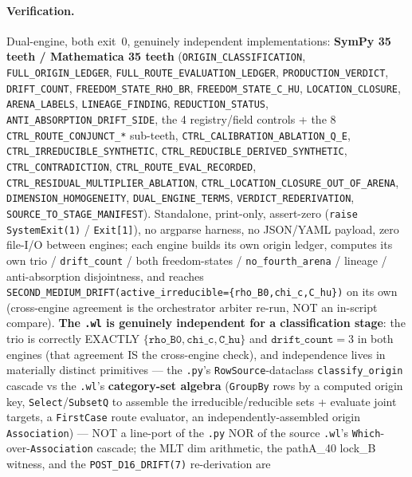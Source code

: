 \paragraph{Verification.}
Dual-engine, both exit~0, genuinely independent implementations:
\textbf{SymPy 35 teeth / Mathematica 35 teeth}
(\texttt{ORIGIN\_CLASSIFICATION}, \texttt{FULL\_ORIGIN\_LEDGER},
\texttt{FULL\_ROUTE\_EVALUATION\_LEDGER}, \texttt{PRODUCTION\_VERDICT},
\texttt{DRIFT\_COUNT}, \texttt{FREEDOM\_STATE\_RHO\_BR},
\texttt{FREEDOM\_STATE\_C\_HU}, \texttt{LOCATION\_CLOSURE}, \texttt{ARENA\_LABELS},
\texttt{LINEAGE\_FINDING}, \texttt{REDUCTION\_STATUS},
\texttt{ANTI\_ABSORPTION\_DRIFT\_SIDE}, the 4 registry/field controls + the 8
\texttt{CTRL\_ROUTE\_CONJUNCT\_*} sub-teeth, \texttt{CTRL\_CALIBRATION\_ABLATION\_Q\_E},
\texttt{CTRL\_IRREDUCIBLE\_SYNTHETIC}, \texttt{CTRL\_REDUCIBLE\_DERIVED\_SYNTHETIC},
\texttt{CTRL\_CONTRADICTION}, \texttt{CTRL\_ROUTE\_EVAL\_RECORDED},
\texttt{CTRL\_RESIDUAL\_MULTIPLIER\_ABLATION},
\texttt{CTRL\_LOCATION\_CLOSURE\_OUT\_OF\_ARENA}, \texttt{DIMENSION\_HOMOGENEITY},
\texttt{DUAL\_ENGINE\_TERMS}, \texttt{VERDICT\_REDERIVATION},
\texttt{SOURCE\_TO\_STAGE\_MANIFEST}). Standalone, print-only, assert-zero
(\texttt{raise SystemExit(1)} / \texttt{Exit[1]}), no argparse harness, no
JSON/YAML payload, zero file-I/O between engines; each engine builds its own
origin ledger, computes its own trio / \texttt{drift\_count} / both
freedom-states / \texttt{no\_fourth\_arena} / lineage / anti-absorption
disjointness, and reaches
\texttt{SECOND\_MEDIUM\_DRIFT(active\_irreducible=\{rho\_B0,chi\_c,C\_hu\})} on its
own (cross-engine agreement is the orchestrator arbiter re-run, NOT an in-script
compare). \textbf{The \texttt{.wl} is genuinely independent for a classification
stage}: the trio is correctly EXACTLY \(\{\texttt{rho\_B0},\texttt{chi\_c},\texttt{C\_hu}\}\)
and \(\texttt{drift\_count}=3\) in both engines (that agreement IS the
cross-engine check), and independence lives in materially distinct primitives ---
the \texttt{.py}'s \texttt{RowSource}-dataclass \texttt{classify\_origin} cascade
vs the \texttt{.wl}'s \textbf{category-set algebra} (\texttt{GroupBy} rows by a
computed origin key, \texttt{Select}/\texttt{SubsetQ} to assemble the
irreducible/reducible sets + evaluate joint targets, a \texttt{FirstCase} route
evaluator, an independently-assembled origin \texttt{Association}) --- NOT a
line-port of the \texttt{.py} NOR of the source \texttt{.wl}'s
\texttt{Which}-over-\texttt{Association} cascade; the MLT dim arithmetic, the
pathA\_40 lock\_B witness, and the \texttt{POST\_D16\_DRIFT(7)} re-derivation are
